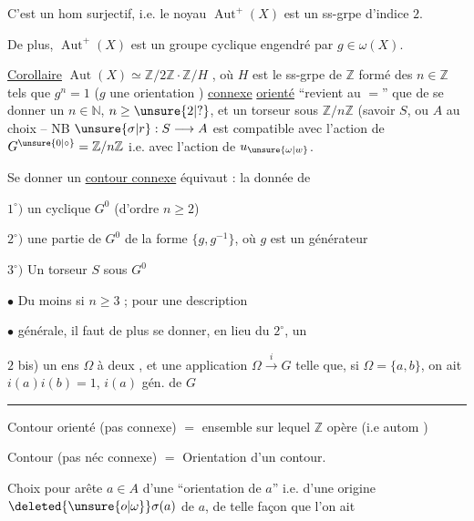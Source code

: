 C'est un hom surjectif, i.e. le noyau $\operatorname{Aut}^{+}(X)$ est un ss-grpe d'indice $2$.

De plus, $\operatorname{Aut}^{+}(X)$ est un groupe cyclique engendré par  $g\in\omega(X)$.

\uline{Corollaire} $\operatorname{Aut}(X)\simeq\mathbb{Z}/2\mathbb{Z}\cdot\mathbb{Z}/H$ , où $H$ est le ss-grpe de $\mathbb{Z}$ formé des $n\in\mathbb{Z}$ tels que $g^{n}=1$ ($g$  une orientation )
\uline{connexe} \uline{orienté} ``revient au $=$'' que de se donner un $n\in\mathbb{N}$, $n\geq\unsure{2|?}$, et un  torseur sous $\mathbb{Z}/n\mathbb{Z}$ (savoir $S$, ou $A$ au choix -- NB $\unsure{\sigma|r}:S\longrightarrow A$ est compatible avec l'action de $G^{\unsure{0|\circ}}=\mathbb{Z}/n\mathbb{Z}$ i.e. avec l'action de $u_{\unsure{\omega|w}}$.

Se donner un \uline{contour connexe} équivaut : la donnée de

$1^{\circ})$ un  cyclique $G^{0}$ (d'ordre $n\geq2$)

$2^{\circ})$ une  partie de $G^{0}$  de la forme $\{g,g^{-1}\}$, où $g$ est un générateur 

$3^{\circ})$ Un torseur $S$ sous $G^{0}$

$\bullet$ Du moins si $n\geq3$  ; pour une description

$\bullet$ générale, il faut de plus se donner, en lieu du $2^{\circ}$, un

$2$ bis) un ens $\Omega$ à deux , et une application $\Omega\xrightarrow{i}G$ telle que, si $\Omega=\{a,b\}$, on ait $i(a)i(b)=1$, $i(a)$ gén. de $G$

\begin{center}\rule{1cm}{.35pt}\end{center}

Contour orienté (pas  connexe) $=$ ensemble sur lequel $\mathbb{Z}$ opère (i.e  autom )

Contour (pas néc connexe) $=$ 
Orientation d'un contour.

Choix pour  arête $a\in A$ d'une ``orientation de $a$'' i.e. d'une origine $\deleted{\unsure{o|\omega}}\sigma(a)$ de $a$, de telle façon que l'on ait

